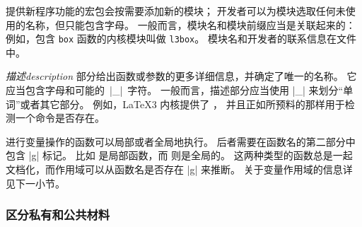 \documentclass{l3doc}
\begin{document}
提供新程序功能的宏包会按需要添加新的模块；
开发者可以为模块选取任何未使用的名称，但只能包含字母。
一般而言，模块名和模块前缀应当是关联起来的：
例如，包含 \texttt{box} 函数的内核模块叫做 \texttt{l3box}。
模块名和开发者的联系信息在文件  中。

%

\emph{描述description} 部分给出函数或参数的更多详细信息，并确定了唯一的名称。
它应当包含字母和可能的~|_|~字符。
一般而言，描述部分应当使用 |_| 来划分“单词”或者其它部分。
例如，\LaTeX3 内核提供了 ，
并且正如所预料的那样用于检测一个命令是否存在。

%

进行变量操作的函数可以局部或者全局地执行。
后者需要在函数名的第二部分中包含 |g| 标记。
比如  是局部函数，而  则是全局的。
这两种类型的函数总是一起文档化，而作用域可以从函数名是否存在 |g| 来推断。
关于变量作用域的信息详见下一小节。

\subsubsection{区分私有和公共材料}

%
%
\end{document}
